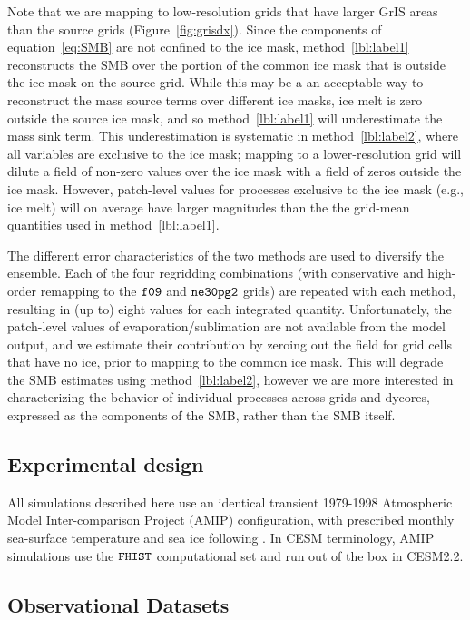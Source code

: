 \documentclass[draft]{agujournal2019}
\begin{document}
Note that we are mapping to low-resolution grids that have larger GrIS areas than the source grids (Figure~\ref{fig:grisdx}). Since the components of equation~\ref{eq:SMB} are not confined to the ice mask, method~\ref{lbl:label1} reconstructs the SMB over the portion of the common ice mask that is outside the ice mask on the source grid. While this may be a an acceptable way to reconstruct the mass source terms over different ice masks, ice melt is zero outside the source ice mask, and so method~\ref{lbl:label1} will underestimate the mass sink term. This underestimation is systematic in method~\ref{lbl:label2}, where all variables are exclusive to the ice mask; mapping to a lower-resolution grid will dilute a field of non-zero values over the ice mask with a field of zeros outside the ice mask. However, patch-level values for processes exclusive to the ice mask (e.g., ice melt) will on average have larger magnitudes than the the grid-mean quantities used in method~\ref{lbl:label1}.

The different error characteristics of the two methods are used to diversify the ensemble. Each of the four regridding combinations (with conservative and high-order remapping to the $\tt f09$ and $\tt ne30pg2$ grids) are repeated with each method, resulting in (up to) eight values for each integrated quantity. Unfortunately, the patch-level values of evaporation/sublimation are not available from the model output, and we estimate their contribution by zeroing out the field for grid cells that have no ice, prior to mapping to the common ice mask. This will degrade the SMB estimates using method~\ref{lbl:label2}, however we are more interested in characterizing the behavior of individual processes across grids and dycores, expressed as the components of the SMB, rather than the SMB itself.

\subsection{Experimental design}

All simulations described here use an identical transient 1979-1998 Atmospheric Model Inter-comparison Project (AMIP) configuration, with prescribed monthly sea-surface temperature and sea ice following . In CESM terminology, AMIP simulations use the $\tt FHIST$ computational set and run out of the box in CESM2.2.

\subsection{Observational Datasets}
\end{document}
